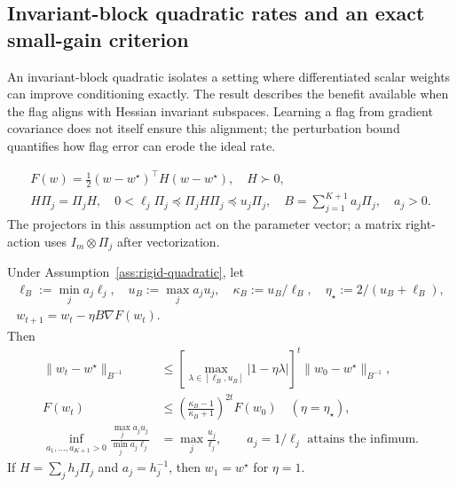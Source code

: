 \subsection{Invariant-block quadratic rates and an exact small-gain criterion}
An invariant-block quadratic isolates a setting where differentiated scalar
weights can improve conditioning exactly. The result describes the benefit
available when the flag aligns with Hessian invariant subspaces. Learning a
flag from gradient covariance does not itself ensure this alignment; the
perturbation bound quantifies how flag error can erode the ideal rate.

\begin{assumption}\label{ass:rigid-quadratic}
\begin{gather}
 F(w)=\tfrac12(w-w^\star)^\top H(w-w^\star),\quad H\succ0,\\
 H\Pi_j=\Pi_jH,\quad
 0<\ell_j\Pi_j\preceq\Pi_jH\Pi_j\preceq u_j\Pi_j,\quad
 B=\sum_{j=1}^{K+1}a_j\Pi_j,\quad a_j>0.
\end{gather}
The projectors in this assumption act on the parameter vector; a matrix
right-action uses $I_m\otimes\Pi_j$ after vectorization.
\end{assumption}
\begin{theorem}\label{thm:rigid-conditioning}
Under Assumption~\ref{ass:rigid-quadratic}, let
\begin{gather}
 \ell_B:=\min_j a_j\ell_j,\quad u_B:=\max_j a_ju_j,\quad
 \kappa_B:=u_B/\ell_B,\quad \eta_\star:=2/(u_B+\ell_B),\\
 w_{t+1}=w_t-\eta B\nabla F(w_t).
\end{gather}
Then
\begin{align}
 \|w_t-w^\star\|_{B^{-1}}
 &\le\left[\max_{\lambda\in[\ell_B,u_B]}|1-\eta\lambda|\right]^t
                  \|w_0-w^\star\|_{B^{-1}},\\
 F(w_t)&\le\left(\frac{\kappa_B-1}{\kappa_B+1}\right)^{2t}F(w_0)
                 \quad(\eta=\eta_\star),\\
 \inf_{a_1,\ldots,a_{K+1}>0}\frac{\max_j a_ju_j}{\min_j a_j\ell_j}
 &=\max_j\frac{u_j}{\ell_j},\qquad a_j=1/\ell_j\text{ attains the infimum}.
\end{align}
If $H=\sum_jh_j\Pi_j$ and $a_j=h_j^{-1}$, then $w_1=w^\star$ for $\eta=1$.
\end{theorem}
